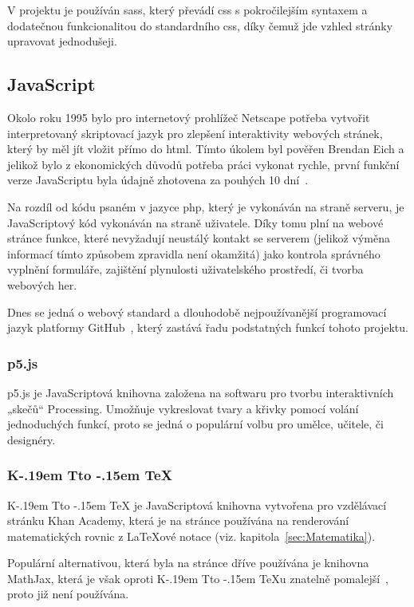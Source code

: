 \documentclass[a4paper, 12pt]{article}
\makeatletter
\newcommand*{\fullref}[1]{\hyperref[{#1}]{\ref*{#1}}}
\DeclareRobustCommand{\KaTeX}{%
  K\kern -.19em
  {\sbox \z@ T\vbox to\ht \z@ {\hbox{%
  \check@mathfonts
  \fontsize\sf@size\z@
  \selectfont A}%
  \vss}%
}\kern -.15em
\TeX}
\makeatother
\begin{document}
  V projektu je používán \gls{sass}, který převádí \gls{css} s pokročilejším syntaxem a dodatečnou funkcionalitou do standardního \gls{css}, díky čemuž jde vzhled stránky upravovat jednodušeji.


  \subsection{JavaScript} \label{sec:JavaScript}
  Okolo roku 1995 bylo pro internetový prohlížeč Netscape potřeba vytvořit interpretovaný skriptovací jazyk pro zlepšení interaktivity webových stránek, který by měl jít vložit přímo do \gls{html}. Tímto úkolem byl pověřen Brendan Eich a jelikož bylo z ekonomických důvodů potřeba práci vykonat rychle, první funkční verze JavaScriptu byla údajně zhotovena za pouhých 10 dní~\cite{the-origin-of-javascript}.

  Na rozdíl od kódu psaném v jazyce \gls{php}, který je vykonáván na straně serveru, je JavaScriptový kód vykonáván na straně uživatele. Díky tomu plní na webové stránce funkce, které nevyžadují neustálý kontakt se serverem (jelikož výměna informací tímto způsobem zpravidla není okamžitá) jako kontrola správného vyplnění formuláře, zajištění plynulosti uživatelského prostředí, či tvorba webových her.

  Dnes se jedná o webový standard a dlouhodobě nejpoužívanější programovací jazyk platformy GitHub~\cite{github-statistics}, který zastává řadu podstatných funkcí tohoto projektu.


  \subsubsection{p5.js} \label{sec:p5.js}
  p5.js je JavaScriptová knihovna založena na softwaru pro tvorbu interaktivních „skečů“ Processing. Umožňuje vykreslovat tvary a křivky pomocí volání jednoduchých funkcí, proto se jedná o populární volbu pro umělce, učitele, či designéry.


  \subsubsection{\texorpdfstring{\KaTeX}{KaTeX}} \label{sec:KaTeX}
  \KaTeX{} je JavaScriptová knihovna vytvořena pro vzdělávací stránku Khan Academy, která je na stránce používána na renderování matematických rovnic z \LaTeX ové notace (viz. kapitola~\fullref{sec:Matematika}).

  Populární alternativou, která byla na stránce dříve používána je knihovna MathJax, která je však oproti \KaTeX u znatelně pomalejší~\cite{katex-mathjax-comparison}, proto již není používána.
\end{document}
